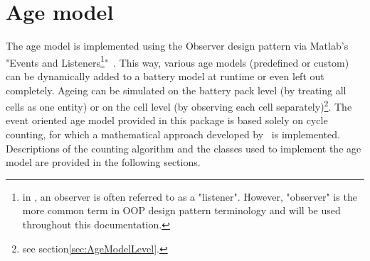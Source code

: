 \section{Age model}
\label{sec:ageModel}
The age model is implemented using the Observer design pattern via Matlab's "Events and Listeners\footnote{in \matlab, an observer is often referred to as a "listener". However, "observer" is the more common term in OOP design pattern terminology and will be used throughout this documentation.}"~\cite{_overview_????}. This way, various age models (predefined or custom) can be dynamically added to a battery model at runtime or even left out completely. Ageing can be simulated on the battery pack level (by treating all cells as one entity) or on the cell level (by observing each cell separately)\footnote{see section\ref{sec:AgeModelLevel}.}. The event oriented age model provided in this package is based solely on cycle counting, for which a mathematical approach developed by~\cite{dambrowski_mathematical_2012} is implemented. Descriptions of the counting algorithm and the classes used to implement the age model are provided in the following sections.

